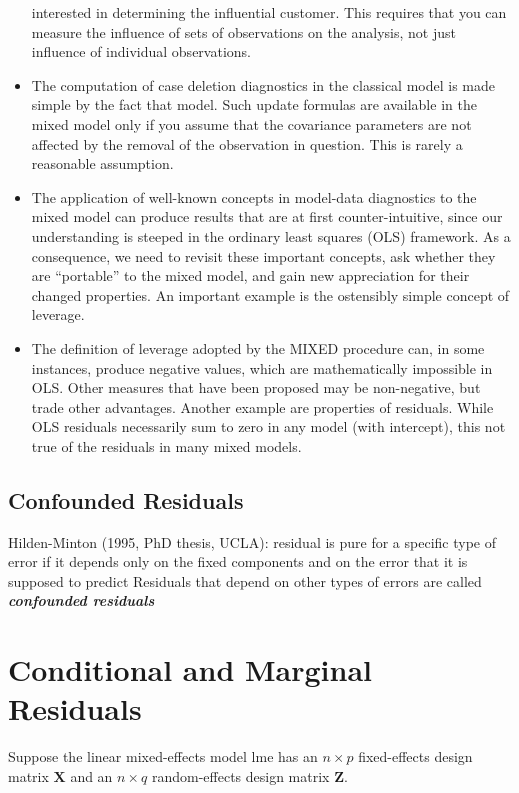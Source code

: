 \documentclass[Main.tex]{subfiles}
\begin{document}
\begin{itemize}
	interested in determining the influential customer. This requires that you can measure the influence
	of sets of observations on the analysis, not just influence of individual observations.
	\item The computation of case deletion diagnostics in the classical model is made simple by the fact that
	model. Such update formulas are available in the mixed model only if you assume that the covariance
	parameters are not affected by the removal of the observation in question. This is rarely a reasonable
	assumption.
	\item The application of well-known concepts in model-data diagnostics to the mixed model can produce results
	that are at first counter-intuitive, since our understanding is steeped in the ordinary least squares
	(OLS) framework. As a consequence, we need to revisit these important concepts, ask whether they
	are “portable” to the mixed model, and gain new appreciation for their changed properties. An important
	example is the ostensibly simple concept of leverage. 
	\item The definition of leverage adopted by
	the MIXED procedure can, in some instances, produce negative values, which are mathematically
	impossible in OLS. Other measures that have been proposed may be non-negative, but trade other
	advantages. Another example are properties of residuals. While OLS residuals necessarily sum to
	zero in any model (with intercept), this not true of the residuals in many mixed models.
\end{itemize}





\subsection{Confounded Residuals}
Hilden-Minton (1995, PhD thesis, UCLA): residual is pure for a
specific type of error if it depends only on the fixed components and
on the error that it is supposed to predict
Residuals that depend on other types of errors are called \textit{\textbf{confounded
		residuals}}

\section{Conditional and Marginal Residuals}


Suppose the linear mixed-effects model lme has an $n \times p$ fixed-effects design matrix $\boldsymbol{X}$ and an $n \times q$ random-effects design matrix $\boldsymbol{Z}$. 
\end{document}
